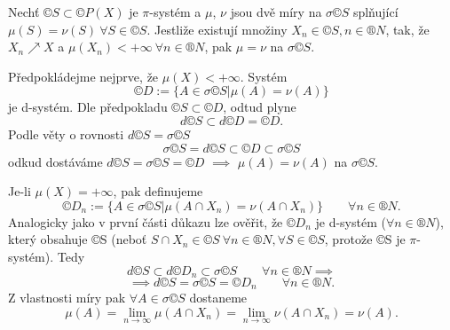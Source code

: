\documentclass[12pt]{article}					%
\begin{document}

\begin{veta}
	Nechť $©S \subset ©P(X)$ je $\pi$-systém a $\mu$, $\nu$ jsou dvě míry na $\sigma ©S$ splňující $\mu(S) = \nu(S)\ \forall S \in ©S$. Jestliže existují množiny $X_n \in ©S, n \in ®N$, tak, že $X_n \nearrow X$ a $\mu(X_n) < +∞\ \forall n \in ®N$, pak $\mu = \nu$ na $\sigma ©S$.

	\begin{dukazin}
		Předpokládejme nejprve, že $\mu(X) < +∞$. Systém
		$$ ©D := \{A \in \sigma ©S | \mu(A) = \nu(A)\} $$
		je d-systém. Dle předpokladu $©S \subset ©D$, odtud plyne
		$$ d ©S \subset d ©D = ©D. $$
		Podle věty o rovnosti $d©S = \sigma ©S$
		$$ \sigma ©S = d©S \subset ©D \subset \sigma ©S $$
		odkud dostáváme $d©S = \sigma ©S = ©D$ $\implies$ $\mu(A) = \nu(A)$ na $\sigma ©S$.

		Je-li $\mu(X) = +∞$, pak definujeme
		$$ ©D_n := \{A \in \sigma ©S | \mu(A \cap X_n) = \nu(A \cap X_n)\} \qquad \forall n \in ®N. $$
		Analogicky jako v první části důkazu lze ověřit, že $©D_n$ je d-systém ($\forall n \in ®N$), který obsahuje ©S (neboť $S \cap X_n \in ©S\ \forall n \in ®N, \forall S \in ©S$, protože ©S je $\pi$-systém). Tedy
		$$ d©S \subset d©D_n \subset \sigma ©S \qquad \forall n \in ®N \implies $$
		$$ \implies d©S = \sigma ©S = ©D_n \qquad \forall n \in ®N. $$
		Z vlastnosti míry pak $\forall A \in \sigma ©S$ dostaneme
		$$ \mu(A) = \lim_{n \rightarrow ∞} \mu(A \cap X_n) = \lim_{n \rightarrow ∞} \nu(A \cap X_n) = \nu(A). $$
	\end{dukazin}
\end{veta}
\end{document}

